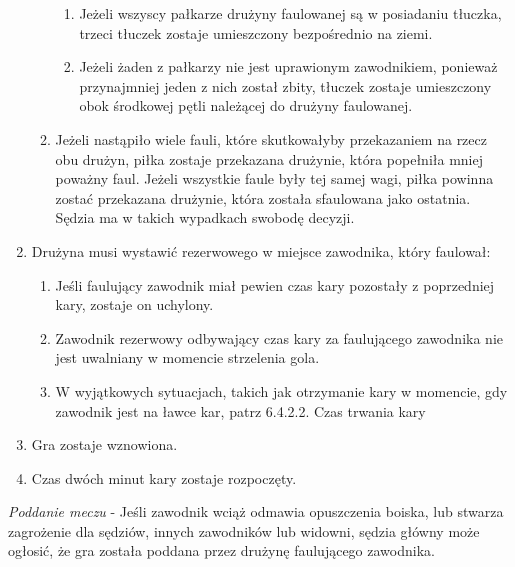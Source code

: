 \documentclass[12pt]{article}
\begin{document}
\begin{enumerate}
\begin{enumerate}
		            \begin{enumerate}
			            \item
			                  Jeżeli wszyscy pałkarze drużyny faulowanej są w posiadaniu
			                  tłuczka, trzeci tłuczek zostaje umieszczony bezpośrednio na ziemi.
			            \item
			                  Jeżeli żaden z pałkarzy nie jest uprawionym zawodnikiem, ponieważ
			                  przynajmniej jeden z nich został zbity, tłuczek zostaje
			                  umieszczony obok środkowej pętli należącej do drużyny faulowanej.
		            \end{enumerate}
		      \item
		            Jeżeli nastąpiło wiele fauli, które skutkowałyby przekazaniem na
		            rzecz obu drużyn, piłka zostaje przekazana drużynie, która popełniła
		            mniej poważny faul. Jeżeli wszystkie faule były tej samej wagi,
		            piłka powinna zostać przekazana drużynie, która została sfaulowana
		            jako ostatnia. Sędzia ma w takich wypadkach swobodę decyzji.
	      \end{enumerate}
	\item
	      Drużyna musi wystawić rezerwowego w miejsce zawodnika, który faulował:

	      \begin{enumerate}
		      \item
		            Jeśli faulujący zawodnik miał pewien czas kary pozostały z
		            poprzedniej kary, zostaje on uchylony.
		      \item
		            Zawodnik rezerwowy odbywający czas kary za faulującego zawodnika nie
		            jest uwalniany w momencie strzelenia gola.
		      \item
		            W wyjątkowych sytuacjach, takich jak otrzymanie kary w momencie, gdy
		            zawodnik jest na ławce kar, patrz 6.4.2.2. Czas trwania kary
	      \end{enumerate}
	\item
	      Gra zostaje wznowiona.
	\item
	      Czas dwóch minut kary zostaje rozpoczęty.
\end{enumerate}

\emph{Poddanie meczu} - Jeśli zawodnik wciąż odmawia opuszczenia boiska,
lub stwarza zagrożenie dla sędziów, innych zawodników lub widowni,
sędzia główny może ogłosić, że gra została poddana przez drużynę
faulującego zawodnika.
\end{document}
